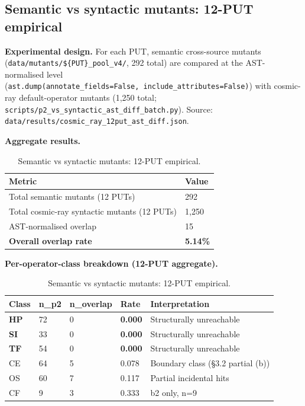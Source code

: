 \documentclass[manuscript,screen,review]{acmart}
\begin{document}
\subsection{Semantic vs syntactic mutants: 12-PUT empirical}\label{p2-vs-syntactic-mutants-12-put-empirical-layer-3}

\textbf{Experimental design.} For each PUT, semantic cross-source mutants
(\texttt{data/mutants/\$\{PUT\}\_pool\_v4/}, 292 total) are compared at
the AST-normalised level
(\texttt{ast.dump(annotate\_fields=False,\ include\_attributes=False)})
with cosmic-ray default-operator mutants (1,250 total;
\texttt{scripts/p2\_vs\_syntactic\_ast\_diff\_batch.py}). Source:
\texttt{data/results/cosmic\_ray\_12put\_ast\_diff.json}.

\textbf{Aggregate results.}

{%
\begin{longtable}[]{@{}ll@{}}
\caption{Semantic vs syntactic mutants: 12-PUT empirical.}\label{tab:p2-04}\\
\toprule\noalign{}
Metric & Value \\
\midrule\noalign{}
\endfirsthead
\endhead
\bottomrule\noalign{}
\endlastfoot
Total semantic mutants (12 PUTs) & 292 \\
Total cosmic-ray syntactic mutants (12 PUTs) & 1,250 \\
AST-normalised overlap & 15 \\
\textbf{Overall overlap rate} & \textbf{5.14\%} \\
\end{longtable}
}

\textbf{Per-operator-class breakdown (12-PUT aggregate).}

{%
\begin{longtable}[]{@{}lllll@{}}
\caption{Semantic vs syntactic mutants: 12-PUT empirical.}\label{tab:p2-05}\\
\toprule\noalign{}
Class & n\_p2 & n\_overlap & Rate & Interpretation \\
\midrule\noalign{}
\endfirsthead
\endhead
\bottomrule\noalign{}
\endlastfoot
\textbf{HP} & 72 & 0 & \textbf{0.000} & Structurally unreachable \\
\textbf{SI} & 33 & 0 & \textbf{0.000} & Structurally unreachable \\
\textbf{TF} & 54 & 0 & \textbf{0.000} & Structurally unreachable \\
CE & 64 & 5 & 0.078 & Boundary class (§3.2 partial (b)) \\
OS & 60 & 7 & 0.117 & Partial incidental hits \\
CF & 9 & 3 & 0.333 & b2 only, n=9 \\
\end{longtable}
}
\end{document}
